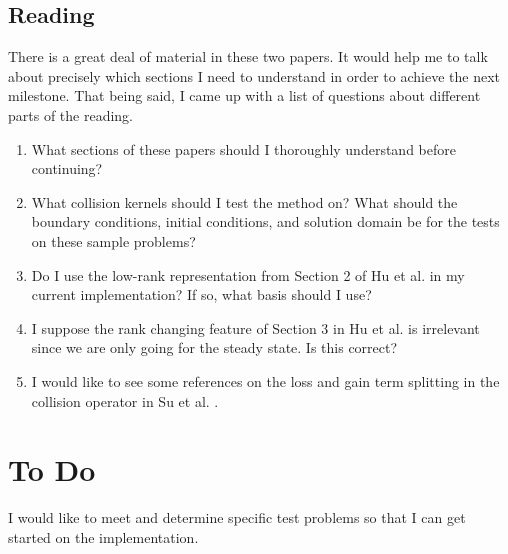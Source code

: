 \documentclass{article}
\begin{document}
\subsection{Reading}
There is a great deal of material in these two papers. It would help me to talk about precisely which sections I need to understand in order to achieve the next milestone. That being said, I came up with a list of questions about different parts of the reading.
\begin{enumerate}
    \item What sections of these papers should I thoroughly understand before continuing?
    \item What collision kernels should I test the method on? What should the boundary conditions, initial conditions, and solution domain be for the tests on these sample problems?
    \item Do I use the low-rank representation from Section 2 of Hu et al. \cite{hu2021adaptive} in my current implementation? If so, what basis should I use?
    \item I suppose the rank changing feature of Section 3 in Hu et al. \cite{hu2021adaptive} is irrelevant since we are only going for the steady state. Is this correct?
    \item I would like to see some references on the loss and gain term splitting in the collision operator in Su et al. \cite{su2019implicit}.
\end{enumerate}
    

\section{To Do}
I would like to meet and determine specific test problems so that I can get started on the implementation.


\end{document}
